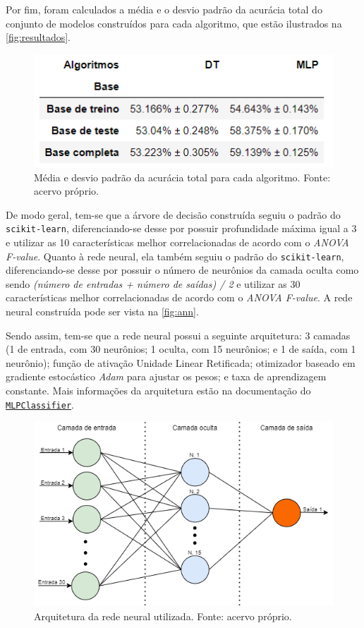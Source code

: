 \documentclass[12pt]{article}
\begin{document}
Por fim, foram calculados a média e o desvio padrão da acurácia total do conjunto de modelos construídos para cada algoritmo, que estão ilustrados na \autoref{fig:resultados}.

\begin{figure}[t!]
    \includegraphics[width=\linewidth]{figures/resultados}
    \caption{Média e desvio padrão da acurácia total para cada algoritmo. Fonte: acervo próprio.}
    \label{fig:resultados}
\end{figure}

De modo geral, tem-se que a árvore de decisão construída seguiu o padrão do \texttt{scikit-learn}, diferenciando-se desse por possuir profundidade máxima igual a 3 e utilizar as 10 características melhor correlacionadas de acordo com o \textit{ANOVA F-value}. Quanto à rede neural, ela também seguiu o padrão do \texttt{scikit-learn}, diferenciando-se desse por possuir o número de neurônios da camada oculta como sendo \textit{(número de entradas + número de saídas) / 2} e utilizar as 30 características melhor correlacionadas de acordo com o \textit{ANOVA F-value}. A rede neural construída pode ser vista na \autoref{fig:ann}.

Sendo assim, tem-se que a rede neural possui a seguinte arquitetura: 3 camadas (1 de entrada, com 30 neurônios; 1 oculta, com 15 neurônios; e 1 de saída, com 1 neurônio); função de ativação Unidade Linear Retificada; otimizador baseado em gradiente estocástico \textit{Adam} para ajustar os pesos; e taxa de aprendizagem constante. Mais informações da arquitetura estão na documentação do \href{https://scikit-learn.org/stable/modules/generated sklearn.neural_network.MLPClassifier.html}{\texttt{MLPClassifier}}.

\begin{figure}[t!]
    \includegraphics[width=\linewidth]{figures/ann}
    \caption{Arquitetura da rede neural utilizada. Fonte: acervo próprio.}
    \label{fig:ann}
\end{figure}
\end{document}
